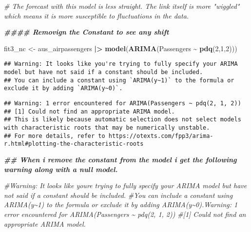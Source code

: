\documentclass[
]{article}
\newenvironment{Shaded}{\begin{snugshade}}{\end{snugshade}}
\newcommand{\CommentTok}[1]{\textcolor[rgb]{0.56,0.35,0.01}{\textit{#1}}}
\newcommand{\DecValTok}[1]{\textcolor[rgb]{0.00,0.00,0.81}{#1}}
\newcommand{\DocumentationTok}[1]{\textcolor[rgb]{0.56,0.35,0.01}{\textbf{\textit{#1}}}}
\newcommand{\FunctionTok}[1]{\textcolor[rgb]{0.13,0.29,0.53}{\textbf{#1}}}
\newcommand{\NormalTok}[1]{#1}
\newcommand{\OtherTok}[1]{\textcolor[rgb]{0.56,0.35,0.01}{#1}}
\newcommand{\SpecialCharTok}[1]{\textcolor[rgb]{0.81,0.36,0.00}{\textbf{#1}}}
\begin{document}
\begin{Shaded}
\begin{Highlighting}[]
\CommentTok{\# The forecast with this model is less straight. The link itself is more "wiggled" which means it is more susceptible to fluctuations in the data.}


\DocumentationTok{\#\#\#\# Removign the Constant to see any shift}

\NormalTok{fit3\_nc }\OtherTok{\textless{}{-}}\NormalTok{ aus\_airpassengers }\SpecialCharTok{|\textgreater{}}   \FunctionTok{model}\NormalTok{(}\FunctionTok{ARIMA}\NormalTok{(Passengers }\SpecialCharTok{\textasciitilde{}} \FunctionTok{pdq}\NormalTok{(}\DecValTok{2}\NormalTok{,}\DecValTok{1}\NormalTok{,}\DecValTok{2}\NormalTok{)))}
\end{Highlighting}
\end{Shaded}

\begin{verbatim}
## Warning: It looks like you're trying to fully specify your ARIMA model but have not said if a constant should be included.
## You can include a constant using `ARIMA(y~1)` to the formula or exclude it by adding `ARIMA(y~0)`.
\end{verbatim}

\begin{verbatim}
## Warning: 1 error encountered for ARIMA(Passengers ~ pdq(2, 1, 2))
## [1] Could not find an appropriate ARIMA model.
## This is likely because automatic selection does not select models with characteristic roots that may be numerically unstable.
## For more details, refer to https://otexts.com/fpp3/arima-r.html#plotting-the-characteristic-roots
\end{verbatim}

\begin{Shaded}
\begin{Highlighting}[]
\DocumentationTok{\#\# When i remove the constant from the model i get the following warning along with a null model. }

\CommentTok{\#Warning: It looks like you\textquotesingle{}re trying to fully specify your ARIMA model but have not said if a constant should be included.}
\CommentTok{\#You can include a constant using \textasciigrave{}ARIMA(y\textasciitilde{}1)\textasciigrave{} to the formula or exclude it by adding \textasciigrave{}ARIMA(y\textasciitilde{}0)\textasciigrave{}.Warning: 1 error encountered for ARIMA(Passengers \textasciitilde{} pdq(2, 1, 2))}
\CommentTok{\#[1] Could not find an appropriate ARIMA model.}
\end{Highlighting}
\end{Shaded}
\end{document}
